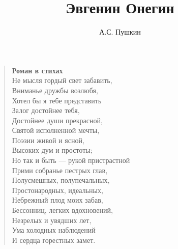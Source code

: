\documentclass{book}
\title{Эвгенин Онегин}
\author{А.С. Пушкин}
\date{}
\newcommand{\ftn}{\footnote}%
\begin{document}
\maketitle
\begin{verse}
\textbf{Роман в стихах}\\
Не мысля гордый свет забавить,\\
Вниманье дружбы возлюбя,\\
Хотел бы я тебе представить\\
Залог достойнее тебя,\\
Достойнее души прекрасной,\\
Святой исполненной мечты,\\
Поэзии живой и ясной,\\
Высоких дум и простоты;\\
Но так и быть — рукой пристрастной\\
Прими собранье пестрых глав,\\
Полусмешных, полупечальных,\\
Простонародных, идеальных,\\
Небрежный плод моих забав,\\
Бессонниц, легких вдохновений,\\
Незрелых и увядших лет,\\
Ума холодных наблюдений\\
И сердца горестных замет.
\end{verse}








%
%
%
%
%
%



%
\end{document}
